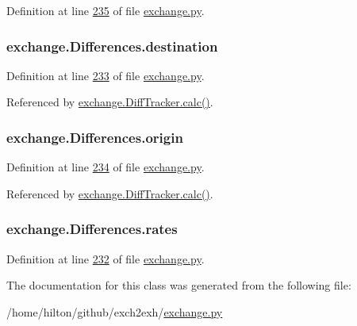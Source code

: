 Definition at line \hyperlink{exchange_8py_source_l00235}{235} of file \hyperlink{exchange_8py_source}{exchange.\+py}.

\subsubsection[{\texorpdfstring{destination}{destination}}]{\setlength{\rightskip}{0pt plus 5cm}exchange.\+Differences.\+destination}\hypertarget{classexchange_1_1_differences_a0092f9963e867db55e7ea2f0bab1b07e}{}\label{classexchange_1_1_differences_a0092f9963e867db55e7ea2f0bab1b07e}


Definition at line \hyperlink{exchange_8py_source_l00233}{233} of file \hyperlink{exchange_8py_source}{exchange.\+py}.



Referenced by \hyperlink{exchange_8py_source_l00272}{exchange.\+Diff\+Tracker.\+calc()}.

\subsubsection[{\texorpdfstring{origin}{origin}}]{\setlength{\rightskip}{0pt plus 5cm}exchange.\+Differences.\+origin}\hypertarget{classexchange_1_1_differences_a25acbe37294f8b4eb5bf909cd84a0b9d}{}\label{classexchange_1_1_differences_a25acbe37294f8b4eb5bf909cd84a0b9d}


Definition at line \hyperlink{exchange_8py_source_l00234}{234} of file \hyperlink{exchange_8py_source}{exchange.\+py}.



Referenced by \hyperlink{exchange_8py_source_l00272}{exchange.\+Diff\+Tracker.\+calc()}.

\subsubsection[{\texorpdfstring{rates}{rates}}]{\setlength{\rightskip}{0pt plus 5cm}exchange.\+Differences.\+rates}\hypertarget{classexchange_1_1_differences_a821ecbc04dae3081f634a28d377c69c3}{}\label{classexchange_1_1_differences_a821ecbc04dae3081f634a28d377c69c3}


Definition at line \hyperlink{exchange_8py_source_l00232}{232} of file \hyperlink{exchange_8py_source}{exchange.\+py}.



The documentation for this class was generated from the following file\+:\begin{DoxyCompactItemize}
\item 
/home/hilton/github/exch2exh/\hyperlink{exchange_8py}{exchange.\+py}\end{DoxyCompactItemize}
